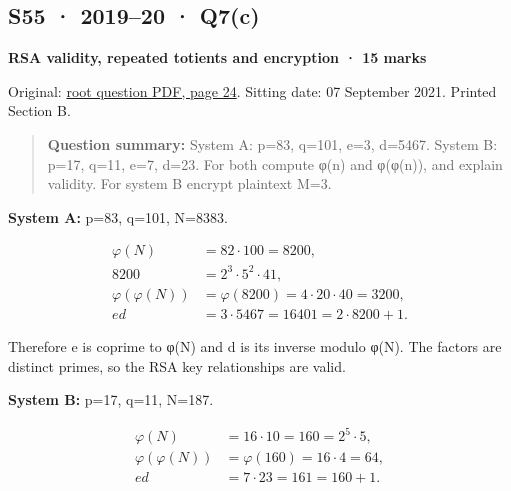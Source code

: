 \documentclass[11pt,a4paper]{article}
\begin{document}
\clearpage
\subsection{S55 · 2019–20 · Q7(c)}\label{s55}

\textbf{RSA validity,\allowbreak{} repeated totients and encryption · 15 marks}


Original: \href{../../CSE405-Security_Merged.pdf\#page=24}{root question PDF,\allowbreak{} page 24}. Sitting date: 07 September 2021. Printed Section B.



\begin{quote}\small

\textbf{Question summary:} System A: p=\allowbreak{}83,\allowbreak{} q=\allowbreak{}101,\allowbreak{} e=\allowbreak{}3,\allowbreak{} d=\allowbreak{}5467. System B: p=\allowbreak{}17,\allowbreak{} q=\allowbreak{}11,\allowbreak{} e=\allowbreak{}7,\allowbreak{} d=\allowbreak{}23. For both compute φ(n) and φ(φ(n)),\allowbreak{} and explain validity. For system B encrypt plaintext M=\allowbreak{}3.



\end{quote}

\textbf{System A:} p=\allowbreak{}83,\allowbreak{} q=\allowbreak{}101,\allowbreak{} N=\allowbreak{}8383.



\[
\begin{aligned}\varphi(N)&=82\cdot100=8200,\\8200&=2^3\cdot5^2\cdot41,\\\varphi(\varphi(N))&=\varphi(8200)=4\cdot20\cdot40=3200,\\ed&=3\cdot5467=16401=2\cdot8200+1.\end{aligned}
\]

Therefore e is coprime to φ(N) and d is its inverse modulo φ(N). The factors are distinct primes,\allowbreak{} so the RSA key relationships are valid.


\textbf{System B:} p=\allowbreak{}17,\allowbreak{} q=\allowbreak{}11,\allowbreak{} N=\allowbreak{}187.



\[
\begin{aligned}\varphi(N)&=16\cdot10=160=2^5\cdot5,\\\varphi(\varphi(N))&=\varphi(160)=16\cdot4=64,\\ed&=7\cdot23=161=160+1.\end{aligned}
\]
\end{document}
